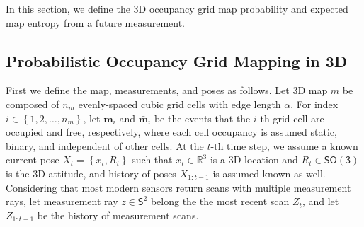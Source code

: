 \documentclass[conf]{new-aiaa}
\newcommand{\braces}[1]{\ensuremath{\left\{ #1 \right\}}}
\newcommand{\SO}{\ensuremath{\mathsf{SO(3)}}}
\renewcommand{\Re}{\ensuremath{\mathbb{R}}}
\newcommand{\Sph}{\ensuremath{\mathsf{S}}}
\begin{document}
In this section, we define the 3D occupancy grid map probability and expected map entropy from a future measurement.

\subsection{Probabilistic Occupancy Grid Mapping in 3D}

First we define the map, measurements, and poses as follows. Let 3D map $ m$ be composed of $n_m$ evenly-spaced cubic grid cells with edge length $\alpha$. For index $i\in\braces{1,2,\ldots,n_m}$, let $\mathbf{m}_i$ and $\bar{\mathbf{m}}_i$ be the events that the $i$-th grid cell are occupied and free, respectively, where each cell occupancy is assumed static, binary, and independent of other cells. At the $t$-th time step, we assume a known current pose $X_t=\braces{x_t,R_t}$ such that $x_t\in\Re^3$ is a 3D location and $R_t\in\SO$ is the 3D attitude, and history of poses $X_{1:t-1}$ is assumed known as well. Considering that most modern sensors return scans with multiple measurement rays, let measurement ray $z\in\Sph^2$ belong the the most recent scan $Z_t$, and let $Z_{1:t-1}$ be the history of measurement scans.
\end{document}
